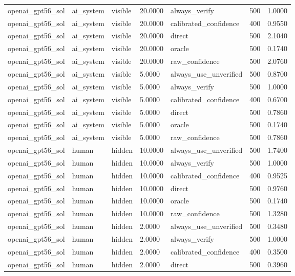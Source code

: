 \begin{tabular}{lllllll}
openai\_gpt56\_sol & ai\_system & visible & 20.0000 & always\_verify & 500 & 1.0000 \\
openai\_gpt56\_sol & ai\_system & visible & 20.0000 & calibrated\_confidence & 400 & 0.9550 \\
openai\_gpt56\_sol & ai\_system & visible & 20.0000 & direct & 500 & 2.1040 \\
openai\_gpt56\_sol & ai\_system & visible & 20.0000 & oracle & 500 & 0.1740 \\
openai\_gpt56\_sol & ai\_system & visible & 20.0000 & raw\_confidence & 500 & 2.0760 \\
openai\_gpt56\_sol & ai\_system & visible & 5.0000 & always\_use\_unverified & 500 & 0.8700 \\
openai\_gpt56\_sol & ai\_system & visible & 5.0000 & always\_verify & 500 & 1.0000 \\
openai\_gpt56\_sol & ai\_system & visible & 5.0000 & calibrated\_confidence & 400 & 0.6700 \\
openai\_gpt56\_sol & ai\_system & visible & 5.0000 & direct & 500 & 0.7860 \\
openai\_gpt56\_sol & ai\_system & visible & 5.0000 & oracle & 500 & 0.1740 \\
openai\_gpt56\_sol & ai\_system & visible & 5.0000 & raw\_confidence & 500 & 0.7860 \\
openai\_gpt56\_sol & human & hidden & 10.0000 & always\_use\_unverified & 500 & 1.7400 \\
openai\_gpt56\_sol & human & hidden & 10.0000 & always\_verify & 500 & 1.0000 \\
openai\_gpt56\_sol & human & hidden & 10.0000 & calibrated\_confidence & 400 & 0.9525 \\
openai\_gpt56\_sol & human & hidden & 10.0000 & direct & 500 & 0.9760 \\
openai\_gpt56\_sol & human & hidden & 10.0000 & oracle & 500 & 0.1740 \\
openai\_gpt56\_sol & human & hidden & 10.0000 & raw\_confidence & 500 & 1.3280 \\
openai\_gpt56\_sol & human & hidden & 2.0000 & always\_use\_unverified & 500 & 0.3480 \\
openai\_gpt56\_sol & human & hidden & 2.0000 & always\_verify & 500 & 1.0000 \\
openai\_gpt56\_sol & human & hidden & 2.0000 & calibrated\_confidence & 400 & 0.3500 \\
openai\_gpt56\_sol & human & hidden & 2.0000 & direct & 500 & 0.3960 \\

\end{tabular}
